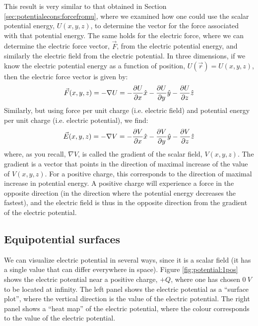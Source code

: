 This result is very similar to that obtained in Section \ref{sec:potentialecons:forcefromu}, where we examined how one could use the scalar potential energy, $U(x,y,z)$, to determine the vector for the force associated with that potential energy. The same holds for the electric force, where we can determine the electric force vector, $\vec F$, from the electric potential energy, and similarly the electric field from the electric potential. In three dimensions, if we know the electric potential energy as a function of position, $U(\vec r)=U(x,y,z)$, then the electric force vector is given by:
\begin{align*}
\vec F(x,y,z) =- \nabla U=-\frac{\partial U}{\partial x}\hat x-\frac{\partial U}{\partial y}\hat y-\frac{\partial U}{\partial z}\hat z
\end{align*}
Similarly, but using force per unit charge (i.e. electric field) and potential energy per unit charge (i.e. electric potential), we find:
\begin{align*}
\vec E(x,y,z) = -\nabla V =-\frac{\partial V}{\partial x}\hat x-\frac{\partial V}{\partial y}\hat y-\frac{\partial V}{\partial z}\hat z
\end{align*}
where, as you recall, $\nabla V$, is called the gradient of the scalar field, $V(x,y,z)$. The gradient is a vector that points in the direction of maximal increase of the value of $V(x,y,z)$. For a positive charge, this corresponds to the direction of maximal increase in potential energy. A positive charge will experience a force in the opposite direction (in the direction where the potential energy decreases the fastest), and the electric field is thus in the opposite direction from the gradient of the electric potential.

\subsection{Equipotential surfaces}
We can visualize electric potential in several ways, since it is a scalar field (it has a single value that can differ everywhere in space). Figure \ref{fig:potential:1pos} shows the electric potential near a positive charge, $+Q$, where one has chosen $\SI{0}{V}$ to be located at infinity. The left panel shows the electric potential as a ``surface plot'', where the vertical direction is the value of the electric potential. The right panel shows a ``heat map'' of the electric potential, where the colour corresponds to the value of the electric potential.


